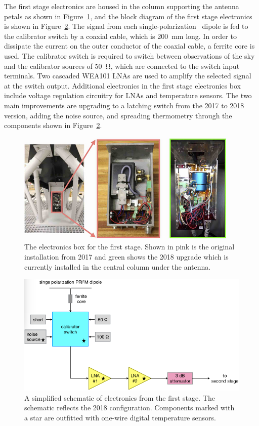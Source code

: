 The first stage electronics are housed in the column supporting the antenna petals as shown in Figure~\ref{Fig:column}, and the block diagram of the first stage electronics is shown in Figure~\ref{Fig:prizm_fee_block}. The signal from each single-polarization \prizm\ dipole is fed to the calibrator switch by a coaxial cable, which is \SI{200}{\milli \meter} long. In order to dissipate the current on the outer conductor of the coaxial cable, a ferrite core is used. The calibrator switch is required to switch between observations of the sky and the calibrator sources of \SI{50}{\ohm}, which are connected to the switch input terminals. Two cascaded WEA101 LNAs are used to amplify the selected signal at the switch output. Additional electronics in the first stage electronics box include voltage regulation circuitry for LNAs and temperature sensors. The two main improvements are upgrading to a latching switch from the 2017 to 2018 version, adding the noise source, and spreading thermometry through the components shown in Figure~\ref{Fig:prizm_fee_block}.

\begin{figure}
	\centering
	\includegraphics[width=0.7\linewidth]{Figures/column}
	\caption{The electronics box for the first stage. Shown in pink is the original installation from 2017 and green shows the 2018 upgrade which is currently installed in the central column under the antenna.}
	\label{Fig:column}
\end{figure}

\begin{figure}
	\centering
	\includegraphics[width=\linewidth]{Figures/prizm_fee_block}
	\caption{A simplified schematic of electronics from the first stage. The schematic reflects the 2018 configuration. Components marked with a star are outfitted with one-wire digital temperature sensors.}
	\label{Fig:prizm_fee_block}
\end{figure}  

